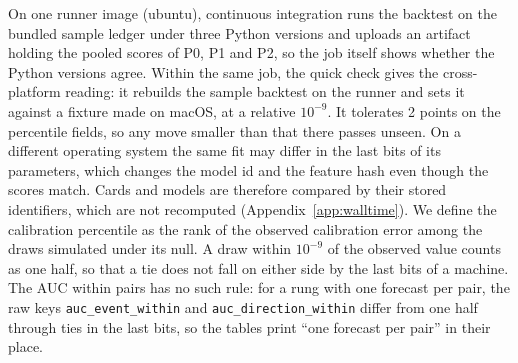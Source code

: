 On one runner image (ubuntu), continuous integration runs the backtest on the bundled sample ledger under three Python versions and uploads an artifact holding the pooled scores of P0, P1 and P2, so the job itself shows whether the Python versions agree. Within the same job, the quick check gives the cross-platform reading: it rebuilds the sample backtest on the runner and sets it against a fixture made on macOS, at a relative $10^{-9}$. It tolerates 2 points on the percentile fields, so any move smaller than that there passes unseen. On a different operating system the same fit may differ in the last bits of its parameters, which changes the model id and the feature hash even though the scores match. Cards and models are therefore compared by their stored identifiers, which are not recomputed (Appendix~\ref{app:walltime}).
We define the calibration percentile as the rank of the observed calibration error among the draws simulated under its null. A draw within $10^{-9}$ of the observed value counts as one half, so that a tie does not fall on either side by the last bits of a machine. The AUC within pairs has no such rule: for a rung with one forecast per pair, the raw keys \texttt{auc\_event\_within} and \texttt{auc\_direction\_within} differ from one half through ties in the last bits, so the tables print ``one forecast per pair'' in their place.

\label{sec:artifact}
